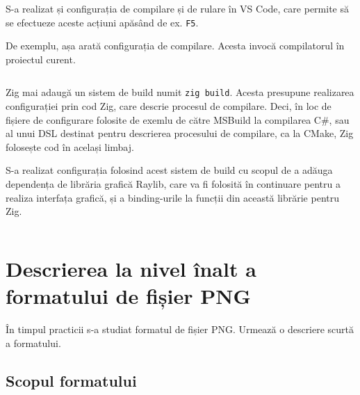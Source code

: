 \documentclass[a4paper,12pt]{report}
\begin{document}
S-a realizat și configurația de compilare și de rulare în VS Code,
care permite să se efectueze aceste acțiuni apăsând de ex. \texttt{F5}.

De exemplu, așa arată configurația de compilare.
Acesta invocă compilatorul în proiectul curent.

\inputminted{json}{../.vscode/tasks.json}

Zig mai adaugă un sistem de build numit \texttt{zig build}.
Acesta presupune realizarea configurației prin cod Zig, care descrie procesul de compilare.
Deci, în loc de fișiere de configurare folosite de exemlu de către MSBuild la compilarea C\#,
sau al unui \ac{DSL} destinat pentru descrierea procesului de compilare, ca la CMake,
Zig folosește cod în același limbaj.

S-a realizat configurația folosind acest sistem de build cu scopul de a adăuga dependența
de librăria grafică Raylib\cite{raylib}, care va fi folosită în continuare pentru a realiza
interfața grafică, și a binding-urile la funcții din această librărie pentru Zig.

\inputminted{zig}{../build.zig}


\section{Descrierea la nivel înalt a formatului de fișier PNG}

În timpul practicii s-a studiat formatul de fișier PNG.
Urmează o descriere scurtă a formatului.

\subsection{Scopul formatului}
\end{document}
